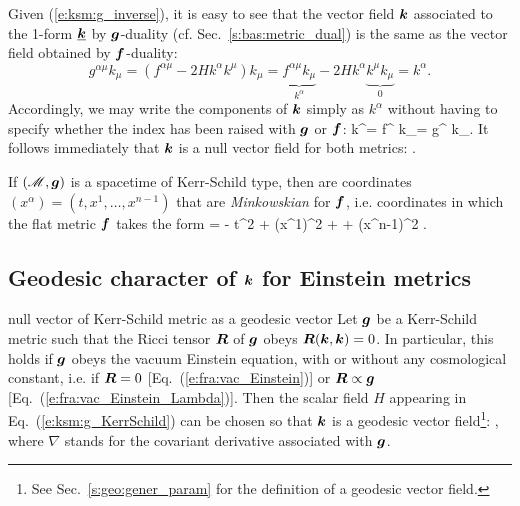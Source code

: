 Given (\ref{e:ksm:g_inverse}), it is easy to see that the vector field
$\bm{k}$ associated
to the 1-form $\underline{\bm{k}}$ by $\bm{g}$-duality (cf. Sec.~\ref{s:bas:metric_dual})
is the same as the vector field
obtained by $\bm{f}$-duality:
\[
    g^{\alpha\mu} k_\mu = (f^{\alpha\mu} - 2 H k^\alpha k^\mu) k_\mu
                        = \underbrace{f^{\alpha\mu} k_\mu}_{k^\alpha}
                          - 2H k^\alpha \underbrace{k^\mu k_\mu}_{0}
                        = k^\alpha .
\]
Accordingly, we may write the components of $\bm{k}$ simply as $k^\alpha$
without having to specify whether the index has been raised with $\bm{g}$ or $\bm{f}$:
\be
    k^\alpha = f^{\alpha\mu} k_\mu  = g^{\alpha\mu} k_\mu .
\ee
It follows immediately that $\bm{k}$ is a null vector field for
both metrics:
\be
   .
\ee


If $(\mathscr{M},\bm{g})$ is a spacetime of Kerr-Schild type, then 
are coordinates $(x^\alpha) = (t,x^1,\ldots,x^{n-1})$ that are \emph{Minkowskian}
for $\bm{f}$, i.e. coordinates in which the flat metric
$\bm{f}$ takes the form
\be
     = - \dd t^2 + (\dd x^1)^2 + \cdots + (\dd x^{n-1})^2 .
\ee

\subsection{Geodesic character of \texorpdfstring{$\bm{k}$}{k} for Einstein metrics} 

\begin{tprop}{null vector of Kerr-Schild metric as a geodesic vector}{}
Let $\bm{g}$ be a Kerr-Schild metric
such that the Ricci tensor $\bm{R}$ of $\bm{g}$ obeys $\bm{R}(\bm{k},\bm{k}) = 0$.
In particular, this holds if $\bm{g}$ obeys the vacuum Einstein
equation,
with or without any cosmological constant,
i.e. if $\bm{R} = 0$ [Eq.~(\ref{e:fra:vac_Einstein})]
or $\bm{R} \propto \bm{g}$ [Eq.~(\ref{e:fra:vac_Einstein_Lambda})].
Then the scalar field $H$ appearing in Eq.~(\ref{e:ksm:g_KerrSchild})
can be chosen so that $\bm{k}$ is a geodesic vector field\footnote{See Sec.~\ref{s:geo:gener_param} for the definition of a geodesic vector field.}:
\be \label{e:ksm:k_geodesic}
    ,
\ee
where $\nabla$ stands for the covariant derivative associated with $\bm{g}$.
\end{tprop}

